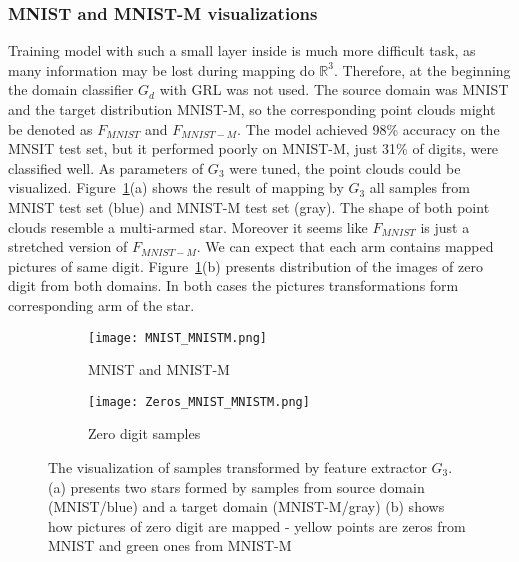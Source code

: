 \documentclass{article}
\begin{document}
\subsubsection{MNIST and MNIST-M visualizations}
Training model with such a small layer inside is much more difficult task, as many information may be lost during mapping do $\mathbb{R}^{3}$. Therefore, at the beginning the domain classifier $G_{d}$ with GRL was not used. The source domain was MNIST and the target distribution MNIST-M, so the corresponding point clouds might be denoted as $F_{MNIST}$ and $F_{MNIST-M}$. The model achieved 98\% accuracy on the MNSIT test set, but it performed poorly on MNIST-M, just 31\% of digits, were classified well. As parameters of $G_{3}$ were tuned, the point clouds could be visualized. Figure~\ref{fig:MNIST_3D}(a) shows the result of mapping by $G_{3}$ all samples from MNIST test set (blue) and MNIST-M test set (gray). The shape of both point clouds resemble a multi-armed star. Moreover it seems like $F_{MNIST}$ is just a stretched version of $F_{MNIST-M}$. We can expect that each arm contains mapped pictures of same digit. Figure~\ref{fig:MNIST_3D}(b) presents distribution of the images of zero digit from both domains. In both cases the pictures transformations form corresponding arm of the star.
\par
\begin{figure}[htb]%
    \centering
    \begin{subfigure}[b]{0.48\textwidth}
        \texttt{[image: MNIST\_MNISTM.png]}
        \caption{MNIST and MNIST-M}
    \end{subfigure}%
    \begin{subfigure}[b]{0.48\textwidth}
        \texttt{[image: Zeros\_MNIST\_MNISTM.png]}
        \caption{Zero digit samples}
    \end{subfigure}%
    \caption{The visualization of samples transformed by feature extractor $G_{3}$. (a) presents two stars formed by samples from source domain (MNIST/blue) and a target domain (MNIST-M/gray) (b) shows how pictures of zero digit are mapped - yellow points are zeros from MNIST and green ones from MNIST-M}%
    \label{fig:MNIST_3D}%
\end{figure}
\end{document}
